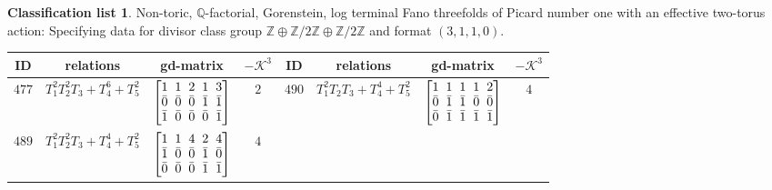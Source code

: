 \documentclass[10pt,a4paper]{amsart}
\theoremstyle{definition}
\newtheorem{class-list}[thm]{Classification list}
\def\ZZ{{\mathbb Z}}
\def\QQ{{\mathbb Q}}
\numberwithin{equation}{section}
\begin{document}
\begin{class-list}
Non-toric, $\QQ$-factorial, Gorenstein, log terminal Fano
threefolds of Picard number one with an effective two-torus action:
Specifying data for divisor class group $\ZZ\oplus \ZZ/2\ZZ\oplus \ZZ/2\ZZ$
and format $(3,1,1,0)$.
\begin{table}[h!]\centering\setlength{\tabcolsep}{3.5pt}
\renewcommand{\arraystretch}{1.15}\small\tabulinesep=1mm
\begin{tabu}{c|c|c|c||c|c|c|c}
\hline
ID&relations&gd-matrix&$-\mathcal{K}^3$&ID&relations&gd-matrix&$-\mathcal{K}^3$
\\
\hline
${477}$&${T_{1}^{2}T_{2}^{2}T_{3}+T_{4}^{6}+T_{5}^{2}}$
&$\arraycolsep=1mm\begin{bmatrix}{1} & {1} & {2} & {1} & {3} \\ {\bar{0}} & {\bar{0}} & {\bar{0}} & {\bar{1}} & {\bar{1}} \\ {\bar{1}} & {\bar{0}} & {\bar{0}} & {\bar{0}} & {\bar{1}}\end{bmatrix}$&${2}$
&${490}$&${T_{1}^{2}T_{2}T_{3}+T_{4}^{4}+T_{5}^{2}}$
&$\arraycolsep=1mm\begin{bmatrix}{1} & {1} & {1} & {1} & {2} \\ {\bar{0}} & {\bar{1}} & {\bar{1}} & {\bar{0}} & {\bar{0}} \\ {\bar{0}} & {\bar{1}} & {\bar{1}} & {\bar{1}} & {\bar{1}}\end{bmatrix}$
&${4}$
\\
\hline
${489}$&${T_{1}^{2}T_{2}^{2}T_{3}+T_{4}^{4}+T_{5}^{2}}$
&$\arraycolsep=1mm\begin{bmatrix}{1} & {1} & {4} & {2} & {4} \\ {\bar{1}} & {\bar{0}} & {\bar{0}} & {\bar{1}} & {\bar{0}} \\ {\bar{0}} & {\bar{0}} & {\bar{0}} & {\bar{1}} & {\bar{1}}\end{bmatrix}$
&${4}$
\\
\end{tabu}%
\end{table}
\end{class-list}
\end{document}
